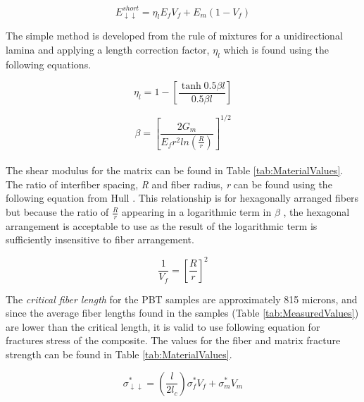 \documentclass[11pt]{article}
\begin{document}
\begin{equation} \label{eq:simple}
E^{short}_{\downarrow \downarrow} = \eta_l E_f V_f + E_m(1-V_f)
\end{equation}

The simple method is developed from the rule of mixtures for a unidirectional lamina and applying a length correction factor, \(\eta_l\) which is found using the following equations.

\begin{equation}
\eta_l = 1- \left[\frac{\tanh 0.5\beta l}{0.5\beta l} \right]
\end{equation}

\begin{equation}
\beta=\left[\frac{2G_m}{E_fr^2 ln(\frac{R}{r})}\right]^{1/2}
\end{equation}
\\
The shear modulus for the matrix can be found in Table \ref{tab:MaterialValues}. The ratio of interfiber spacing, \textit{R} and fiber radius, \textit{r} can be found using the following equation from Hull \cite{hull}. This relationship is for hexagonally arranged fibers but because the ratio of \(\frac{R}{r}\) appearing in a logarithmic term in \(\beta\) , the hexagonal arrangement is acceptable to use as the result of the logarithmic term is sufficiently insensitive to fiber arrangement.

\begin{equation}
\frac{1}{V_f}=\left[\frac{R}{r}\right]^2
\end{equation}

The \textit{critical fiber length} for the PBT samples are approximately 815 microns, and since the average fiber lengths found in the samples (Table \ref{tab:MeasuredValues}) are lower than the critical length, it is valid to use following equation for fractures stress of the composite. The values for the fiber and matrix fracture strength can be found in Table \ref{tab:MaterialValues}.
 
\begin{equation} \label{eq:fracture}
\sigma^*_{\downarrow \downarrow} = \left( \frac{l}{2l_c}\right) \sigma_f^* V_f + \sigma^*_m V_m
\end{equation}
\end{document}
